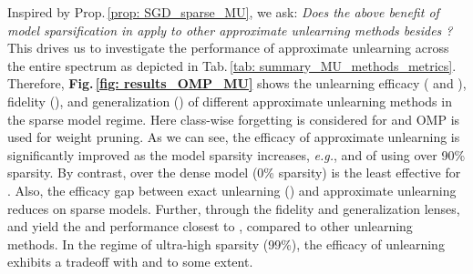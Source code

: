 Inspired by Prop.\,\ref{prop: SGD_sparse_MU}, we ask: 
\textit{Does the above   benefit of model sparsification in {\MU} apply to   other approximate unlearning methods besides {\GA}?} This drives us to investigate the performance of approximate unlearning across the entire spectrum as depicted in  {Tab.\,\ref{tab: summary_MU_methods_metrics}}.
Therefore,
\textbf{Fig.\,\ref{fig: results_OMP_MU}} shows the unlearning efficacy ({\UA} and {\MIAF}), fidelity ({\RA}), and generalization ({\TA}) of different   approximate unlearning methods   in the sparse model regime. Here class-wise forgetting is considered for {\MU} and OMP is used for weight pruning. 
As we can see, the efficacy of approximate unlearning is significantly improved as the model sparsity increases, \textit{e.g.},   {\UA} and {\MIAF} of using {\FT} over 90\% sparsity.  By contrast, {\FT} over the dense  model (0\% sparsity) is the least effective for {\MU}. 
Also, the efficacy gap between exact unlearning ({\retrain}) and  approximate unlearning  reduces on sparse models. Further, through the fidelity and generalization lenses, {\FT} and {\FF} yield the {\RA} and {\TA}  performance closest to {\retrain}, compared to other unlearning methods. In the regime of ultra-high  sparsity (99\%), 
the efficacy of unlearning exhibits a tradeoff with  {\RA} and {\TA} to some extent.   



